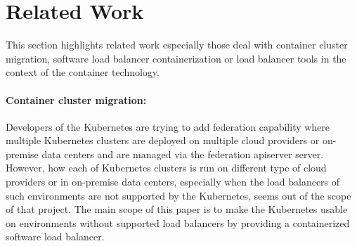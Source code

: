 \section{Related Work}\label{Related Work}

This section highlights related work especially those deal with container cluster migration, 
software load balancer containerization or load balancer tools in the context of the container technology.

\paragraph{\bf Container cluster migration:}

Developers of the Kubernetes are trying to add federation\cite{K8sFederation2017} capability 
where multiple Kubernetes clusters are deployed on multiple cloud providers or on-premise data centers 
and are managed via the federation apiserver server. However, how each of Kubernetes clusters is run on different type of cloud providers
or in on-premise data centers, especially when the load balancers of such environments are not supported by the Kubernetes, 
seems out of the scope of that project. 
The main scope of this paper is to make the Kubernetes usable on environments 
without supported load balancers by providing a containerized software load balancer.

